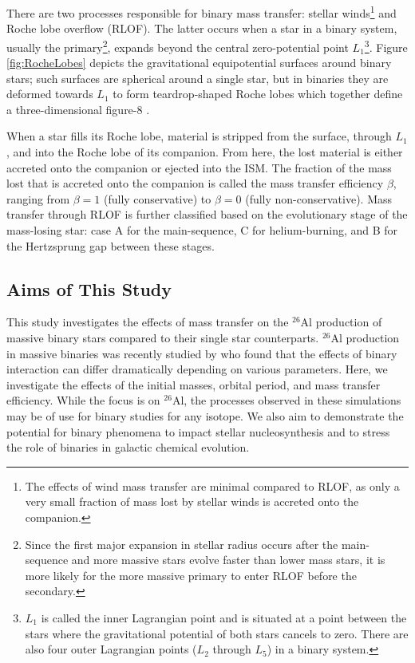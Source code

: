 There are two processes responsible for binary mass transfer: stellar winds\footnote{The effects of wind mass transfer are minimal compared to RLOF, as only a very small fraction of mass lost by stellar winds is accreted onto the companion.} and Roche lobe overflow (RLOF).
The latter occurs when a star in a binary system, usually the primary\footnote{Since the first major expansion in stellar radius occurs after the main-sequence and more massive stars evolve faster than lower mass stars, it is more likely for the more massive primary to enter RLOF before the secondary.}, expands beyond the central zero-potential point $L_1$\footnote{$L_1$ is called the inner Lagrangian point and is situated at a point between the stars where the gravitational potential of both stars cancels to zero. There are also four outer Lagrangian points ($L_2$ through $L_5$) in a binary system.}.
Figure \ref{fig:RocheLobes} depicts the gravitational equipotential surfaces around binary stars; such surfaces are spherical around a single star, but in binaries they are deformed towards $L_1$ to form teardrop-shaped Roche lobes which together define a three-dimensional figure-8 \citep{Iliadis2015}.

When a star fills its Roche lobe, material is stripped from the surface, through $L_1$, and into the Roche lobe of its companion.
From here, the lost material is either accreted onto the companion or ejected into the ISM.
The fraction of the mass lost that is accreted onto the companion is called the mass transfer efficiency $\beta$\footnotemark, ranging from $\beta = 1$ (fully conservative) to $\beta = 0$ (fully non-conservative).
Mass transfer through RLOF is further classified based on the evolutionary stage of the mass-losing star: case A for the main-sequence, C for helium-burning, and B for the Hertzsprung gap between these stages.

\subsection{Aims of This Study}

This study investigates the effects of mass transfer on the $^{26}$Al production of massive binary stars compared to their single star counterparts.
$^{26}$Al production in massive binaries was recently studied by \cite{2019ApJ...884...38B} who found that the effects of binary interaction can differ dramatically depending on various parameters.
%
Here, we investigate the effects of the initial masses, orbital period, and mass transfer efficiency.
While the focus is on $^{26}$Al, the processes observed in these simulations may be of use for binary studies for any isotope.
We also aim to demonstrate the potential for binary phenomena to impact stellar nucleosynthesis and to stress the role of binaries in galactic chemical evolution.